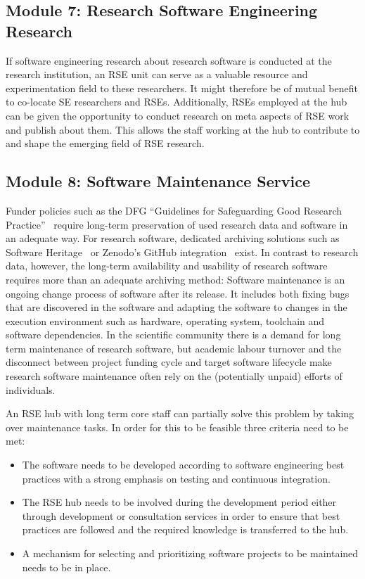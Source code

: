 \documentclass[a4paper]{article}
\begin{document}
\subsection{Module 7: Research Software Engineering Research}%
\label{sec:rseresearch}

If software engineering research about research software is conducted at the research institution, an RSE unit can serve as a valuable resource and experimentation field to these researchers.
It might therefore be of mutual benefit to co-locate SE researchers and RSEs.
Additionally, RSEs employed at the hub can be given the opportunity to conduct research on meta aspects of RSE work and publish about them.
This allows the staff working at the hub to contribute to and shape the emerging field of RSE research.

\subsection{Module 8: Software Maintenance Service}%
\label{sec:maintenance}

Funder policies such as the DFG “Guidelines for Safeguarding Good Research Practice”~\autocite{dfg_gsp} require long-term preservation of used research data and software in an adequate way.
For research software, dedicated archiving solutions such as Software Heritage~\autocite{DiCosmo2020,DiCosmo2023} or Zenodo's GitHub integration~\autocite{GitHubZenodo} exist.
In contrast to research data, however, the long-term availability and usability of research software requires more than an adequate archiving method:
Software maintenance is an ongoing change process of software after its release.
It includes  both fixing bugs that are discovered in the software and adapting the software to changes in the execution environment such as hardware, operating system, toolchain and software dependencies.
In the scientific community there is a demand for long term maintenance of research software,
 but academic labour turnover and the disconnect between project funding cycle and target software lifecycle make research software maintenance often rely on the (potentially unpaid) efforts of individuals.

An RSE hub with long term core staff can partially solve this problem by taking over maintenance tasks.
In order for this to be feasible three criteria need to be met:
\begin{itemize}
\item The software needs to be developed according to software engineering best practices with a strong emphasis on testing and continuous integration.
\item The RSE hub needs to be involved during the development period either through development or consultation services in order to ensure that best practices are followed and the required knowledge is transferred to the hub.
\item A mechanism for selecting and prioritizing software projects to be maintained needs to be in place.
\end{itemize}
\end{document}
